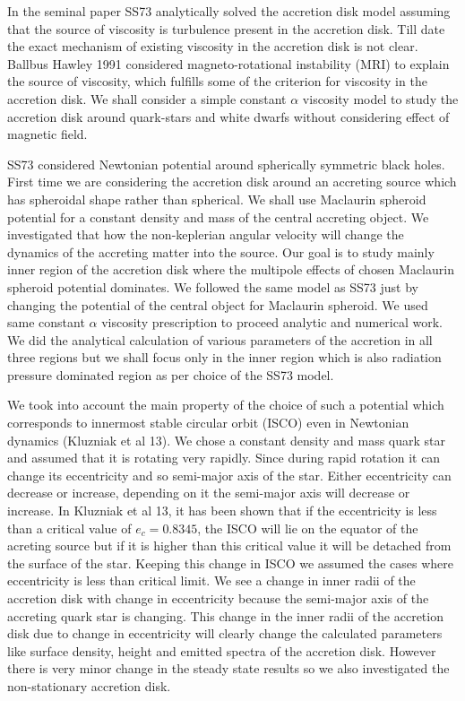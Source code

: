 \documentclass[useAMS,usenatbib]{mn2e}
\begin{document}
In the seminal paper SS73 analytically solved the accretion disk model assuming that the source of viscosity is turbulence present in the accretion disk. Till date the exact mechanism of existing viscosity in the accretion disk is not clear. Ballbus Hawley 1991 considered magneto-rotational instability (MRI) to explain the source of viscosity, which fulfills some of the criterion for viscosity in the accretion disk. We shall consider a simple constant $\alpha$ viscosity model to study the accretion disk around quark-stars and white dwarfs without considering effect of magnetic field.

SS73 considered Newtonian potential around spherically symmetric black holes. First time we are considering the accretion disk around an accreting source which has spheroidal shape rather than spherical. We shall use Maclaurin spheroid potential for a constant density and mass of the central accreting object. We investigated that how the non-keplerian angular velocity will change the dynamics of the accreting matter into the source. Our goal is to study mainly inner region of the accretion disk where the multipole effects of chosen Maclaurin spheroid potential dominates. We followed the same model as SS73 just by changing the potential of the central object for Maclaurin spheroid. We used same constant $\alpha$ viscosity prescription to proceed analytic and numerical work. We did the analytical calculation of various parameters of the accretion in all three regions but we shall focus only in the inner region which is also radiation pressure dominated region as per choice of the SS73 model. 

We took into account the main property of the choice of such a potential which corresponds to innermost stable circular orbit (ISCO) even in Newtonian dynamics (Kluzniak et al 13). We chose a constant density and mass quark star and assumed that it is rotating very rapidly. Since during rapid rotation it can change its eccentricity and so semi-major axis of the star. Either eccentricity can decrease or increase, depending on it the semi-major axis will decrease or increase. In Kluzniak et al 13, it has been shown that if the eccentricity is less than a critical value of $e_c = 0.8345$, the ISCO will lie on the equator of the acreting source but if it is higher than this critical value it will be detached from the surface of the star. Keeping this change in ISCO we assumed the cases where eccentricity is less than critical limit. We see a change in inner radii of the accretion disk with change in eccentricity because the semi-major axis of the accreting quark star is changing. This change in the inner radii of the accretion disk due to change in eccentricity will clearly change the calculated parameters like surface density, height and emitted spectra of the accretion disk. However there is very minor change in the steady state results so we also investigated the non-stationary accretion disk.
\end{document}
